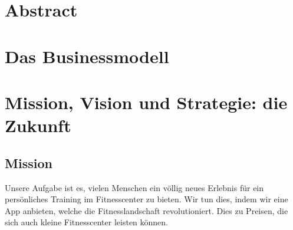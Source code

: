 

\newcommand{\SUBJECT}{Businessplan}
\newcommand{\TITLE}{GitFit}









\section{Abstract}
\cite{ackema:1998}




\section{Das Businessmodell}

\section{Mission, Vision und Strategie: die Zukunft}
\subsection{Mission}
Unsere Aufgabe ist es, vielen Menschen ein völlig neues Erlebnis für ein persönliches Training im Fitnesscenter zu bieten. Wir tun dies, indem wir eine App anbieten, welche die Fitnesslandschaft revolutioniert. Dies zu Preisen, die sich auch kleine Fitnesscenter leisten können.

